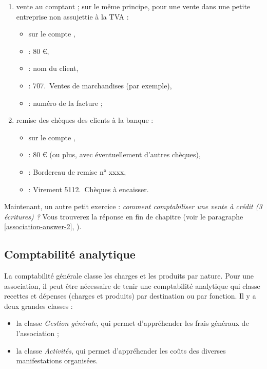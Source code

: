 \begin{enumerate}
\begin{itemize}
\begin{itemize}
				\end{itemize}
		\end{itemize}	
	\item vente au comptant ; sur le même principe, pour une vente dans une petite entreprise non assujettie à la TVA :
		\begin{itemize}
			\item sur le compte ,
			\item {} : 80 €,					
			\item {} : nom du client,
			\item {} : 707.~Ventes de marchandises (par exemple),
			\item {} : numéro de la facture ;
		\end{itemize}						
	\item remise des chèques des clients à la banque :
		\begin{itemize}
			\item sur le compte ,
			\item {} : 80 € (ou plus, avec éventuellement d’autres chèques),					
			\item {} : Bordereau de remise n° xxxx,
			\item {} : Virement 5112.~Chèques à encaisser.
		\end{itemize}		
\end{enumerate}

Maintenant, un autre petit exercice : \emph{comment comptabiliser une vente à crédit (3 écritures) ?} Vous trouverez la réponse en fin de chapitre (voir le paragraphe \vref{association-answer-2}, ).


\subsection{Comptabilité analytique\label{association-plan-analytic}}

La comptabilité générale classe les charges et les produits par nature. Pour une association, il peut être nécessaire de tenir une comptabilité analytique qui classe recettes et dépenses (charges et produits) par destination ou par fonction. Il y a deux grandes classes :

\begin{itemize}
	\item la classe \emph{Gestion générale}, qui permet d'appréhender les frais généraux de l'association ;
	\item la classe \emph{Activités}, qui permet d'appréhender les coûts des diverses manifestations organisées.
\end{itemize}

